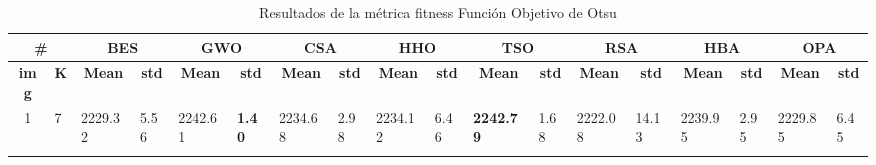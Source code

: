 \documentclass[conference]{IEEEtran}
\begin{document}
\begin{table}[]
	\caption{Resultados de la métrica fitness Función Objetivo de Otsu}
	\begin{tabular}{
			|p{0.2cm}|p{0.2cm}| %
			p{0.8cm}|p{0.4cm}| %
			p{0.8cm}|p{0.4cm}| %
			p{0.8cm}|p{0.4cm}| %
			p{0.8cm}|p{0.4cm}| %
			p{0.8cm}|p{0.4cm}| %
			p{0.8cm}|p{0.4cm}| %
			p{0.8cm}|p{0.4cm}| %
			p{0.8cm}|p{0.4cm}| %
		}
		\hline
		\multicolumn{2}{|c|}{\textbf{\#}} & \multicolumn{2}{c|}{\textbf{BES}} & \multicolumn{2}{c|}{\textbf{GWO}} & \multicolumn{2}{c|}{\textbf{CSA}} & \multicolumn{2}{c|}{\textbf{HHO}} & \multicolumn{2}{c|}{\textbf{TSO}} & \multicolumn{2}{c|}{\textbf{RSA}} & \multicolumn{2}{c|}{\textbf{HBA}} & \multicolumn{2}{c|}{\textbf{OPA}} \\ \hline
		\multicolumn{1}{|c|}{\textbf{img}}                & \multicolumn{1}{c|}{\textbf{K}} & \multicolumn{1}{c|}{\textbf{Mean}} & \multicolumn{1}{c|}{\textbf{std}} & \multicolumn{1}{c|}{\textbf{Mean}}    & \multicolumn{1}{c|}{\textbf{std}} & \multicolumn{1}{c|}{\textbf{Mean}} & \multicolumn{1}{c|}{\textbf{std}} & \multicolumn{1}{c|}{\textbf{Mean}} & \multicolumn{1}{c|}{\textbf{std}} & \multicolumn{1}{c|}{\textbf{Mean}}        & \multicolumn{1}{c|}{\textbf{std}} & \multicolumn{1}{c|}{\textbf{Mean}} & \multicolumn{1}{c|}{\textbf{std}} & \multicolumn{1}{c|}{\textbf{Mean}}    & \multicolumn{1}{c|}{\textbf{std}} & \multicolumn{1}{c|}{\textbf{Mean}} & \multicolumn{1}{c|}{\textbf{std}} \\ \hline
		\multicolumn{1}{|c|}{\multirow{3}{*}{1}}          & 7                               & \multicolumn{1}{l|}{2229.32}       & 5.56                              & \multicolumn{1}{l|}{2242.61}          & \textbf{1.40}                     & \multicolumn{1}{l|}{2234.68}       & 2.98                              & \multicolumn{1}{l|}{2234.12}       & 6.46                              & \multicolumn{1}{l|}{\textbf{2242.79}}     & 1.68                              & \multicolumn{1}{l|}{2222.08}       & 14.13                             & \multicolumn{1}{l|}{2239.95}          & 2.95                              & \multicolumn{1}{l|}{2229.85}       & 6.45                              \\ \cline{2-18} 

\end{tabular}
\end{table}
\end{document}
